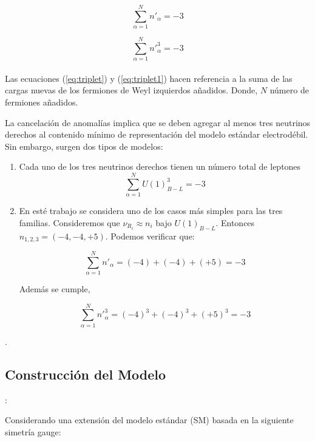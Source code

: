 \documentclass[12pt]{article}
\begin{document}
\begin{equation}
\label{eq:triplet}
    \sum_{\alpha=1}^N n'_{\alpha}=-3 
\end{equation}

\begin{equation}
\label{eq:triplet1}
    \sum_{\alpha=1}^N n'^{3}_{\alpha}=-3 
\end{equation}\\ 

Las ecuaciones (\ref{eq:triplet}) y (\ref{eq:triplet1}) hacen referencia a la suma de las cargas nuevas de los fermiones de Weyl izquierdos añadidos. Donde, $N$ número de fermiones añadidos.

La cancelación de anomalías implica que se deben agregar al menos tres neutrinos derechos al contenido mínimo de representación del modelo estándar electrodébil. Sin embargo, surgen dos tipos de modelos:

\begin{enumerate}
\item Cada uno de los tres neutrinos derechos tienen un número total de leptones 
\begin{equation}
\label{eq:triplet2}
    \sum_{\alpha=1}^N U(1)_{B-L}^{3}=-3 
\end{equation}
\item En esté trabajo se considera uno de los casos más simples para las tres familias. Consideremos que $\nu_{R_i} \approx n_i $ bajo $U(1)_{B-L}$. Entonces $n_{1,2,3}=(-4,-4,+5)$. Podemos verificar que:


\begin{equation}
\label{eq:triplet3}
    \sum_{\alpha=1}^N n'_{\alpha}=(-4) + (-4)+ (+5) = -3
\end{equation}

Además se cumple,  

\begin{equation}
\label{eq:triplet4}
    \sum_{\alpha=1}^N n'^{3}_{\alpha}=(-4)^3 + (-4)^3+ (+5)^3 = -3
\end{equation}
\end{enumerate}.


\subsection{Construcción del Modelo }:


Considerando una extensión del modelo estándar (SM) basada en la siguiente simetría gauge: 
\end{document}
